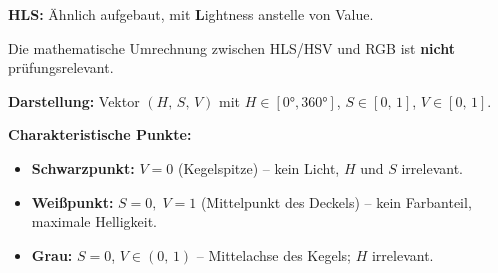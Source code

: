 \documentclass[12pt, a4paper]{article}
\begin{document}
\textbf{HLS:} Ähnlich aufgebaut, mit \textbf{L}ightness anstelle von Value.

\begin{notebox}
  Die mathematische Umrechnung zwischen HLS/HSV und RGB ist
  \textbf{nicht} prüfungsrelevant.
\end{notebox}

\textbf{Darstellung:} Vektor $(H,\,S,\,V)$ mit $H \in [0°, 360°]$,
$S \in [0,\,1]$, $V \in [0,\,1]$.

\textbf{Charakteristische Punkte:}
\begin{itemize}
  \item \textbf{Schwarzpunkt:} $V = 0$ (Kegelspitze) -- kein Licht,
        $H$ und $S$ irrelevant.
  \item \textbf{Weißpunkt:} $S = 0,\; V = 1$ (Mittelpunkt des Deckels) --
        kein Farbanteil, maximale Helligkeit.
  \item \textbf{Grau:} $S = 0$, $V \in (0,\,1)$ -- Mittelachse des Kegels;
        $H$ irrelevant.
\end{itemize}
\end{document}
